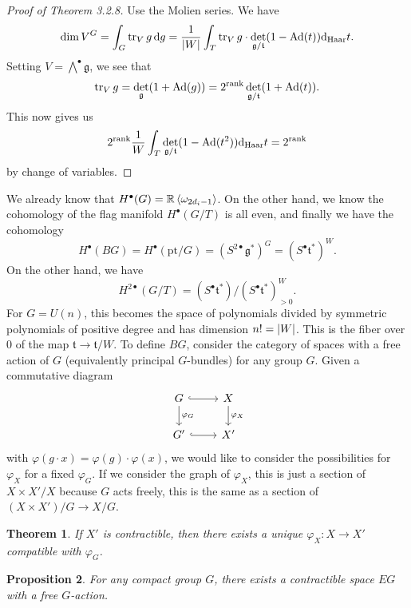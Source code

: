 \documentclass[leqno, openany]{memoir}
\newtheorem{thm}{Theorem}[section]
\newtheorem{prop}[thm]{Proposition}
\theoremstyle{definition}
\theoremstyle{remark}
\theoremstyle{plain}
\theoremstyle{definition}
\theoremstyle{remark}
\newcommand{\R}{\mathbb{R}}
\newcommand{\mf}[1]{\mathfrak{#1}}
\newcommand{\mr}[1]{\mathrm{#1}}
\DeclareMathOperator{\Ad}{Ad}
\begin{document}
\begin{proof}[Proof of Theorem 3.2.8]
    Use the Molien series. We have
    \[ \dim V^G = \int_G \tr_V g \dd{g} = \frac{1}{\abs{W}} \int_T \tr_V g \cdot \det_{\mf{g}/\mf{t}} (1 - \Ad(t)) \dd_{\mr{Haar}} t. \]
    Setting $V = \bigwedge^{\bullet} \mf{g}$, we see that 
    \[ \tr_V g = \det_{\mf{g}} (1 + \Ad(g)) = 2^{\rank} \det_{\mf{g}/\mf{t}} (1 + \Ad(t)). \]
    This now gives us
    \[ 2^{\rank} \frac{1}{W} \int_T \det_{\mf{g}/\mf{t}} (1 - \Ad(t^2)) \dd_{\mr{Haar}} t = 2^{\rank} \]
    by change of variables.
\end{proof}

We already know that $H^{\bullet}(G) = \R \ev{\omega_{2d_i - 1}}$. On the other hand, we know the cohomology of the flag manifold $H^{\bullet}(G/T)$ is all even, and finally we have the cohomology 
\[ H^{\bullet}(BG) = H^{\bullet}(\mr{pt} /G) = {(S^{2\bullet} \mf{g}^*)}^G = {(S^{\bullet} \mf{t}^*)}^W. \]
On the other hand, we have
\[ H^{2\bullet}(G/T) = {(S^{\bullet} \mf{t}^*)} / {(S^{\bullet} \mf{t}^*)}^W_{>0}. \]
For $G = U(n)$, this becomes the space of polynomials divided by symmetric polynomials of positive degree and has dimension $n! = \abs{W}$. This is the fiber over $0$ of the map $\mf{t} \to \mf{t} / W$. To define $BG$, consider the category of spaces with a free action of $G$ (equivalently principal $G$-bundles) for any group $G$. Given a commutative diagram
\begin{equation*}
\begin{tikzcd}
    G \ar[hookrightarrow]{r} \ar{d}{\varphi_G} & X \ar{d}{\varphi_X} \\
    G' \ar[hookrightarrow]{r} & X'
\end{tikzcd}
\end{equation*}
with $\varphi(g \cdot x) = \varphi(g) \cdot \varphi(x)$, we would like to consider the possibilities for $\varphi_X$ for a fixed $\varphi_G$. If we consider the graph of $\varphi_X$, this is just a section of $X \times X' / X$ because $G$ acts freely, this is the same as a section of $(X \times X')/G \to X/G$.

\begin{thm}
    If $X'$ is contractible, then there exists a unique $\varphi_X \colon X \to X'$ compatible with $\varphi_G$.
\end{thm}

\begin{prop}
    For any compact group $G$, there exists a contractible space $EG$ with a free $G$-action.
\end{prop}
\end{document}
